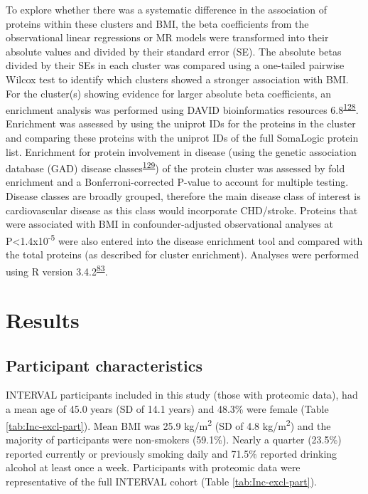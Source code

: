 \documentclass[11pt,twoside]{bristolthesis}
\begin{document}
To explore whether there was a systematic difference in the association of proteins within these clusters and BMI, the beta coefficients from the observational linear regressions or MR models were transformed into their absolute values and divided by their standard error (SE). The absolute betas divided by their SEs in each cluster was compared using a one-tailed pairwise Wilcox test to identify which clusters showed a stronger association with BMI. For the cluster(s) showing evidence for larger absolute beta coefficients, an enrichment analysis was performed using DAVID bioinformatics resources 6.8\textsuperscript{\protect\hyperlink{ref-Huang2009}{128}}. Enrichment was assessed by using the uniprot IDs for the proteins in the cluster and comparing these proteins with the uniprot IDs of the full SomaLogic protein list. Enrichment for protein involvement in disease (using the genetic association database (GAD) disease classes\textsuperscript{\protect\hyperlink{ref-Becker2004a}{129}}) of the protein cluster was assessed by fold enrichment and a Bonferroni-corrected P-value to account for multiple testing. Disease classes are broadly grouped, therefore the main disease class of interest is cardiovascular disease as this class would incorporate CHD/stroke. Proteins that were associated with BMI in confounder-adjusted observational analyses at P\textless1.4x10\textsuperscript{-5} were also entered into the disease enrichment tool and compared with the total proteins (as described for cluster enrichment). Analyses were performed using R version 3.4.2\textsuperscript{\protect\hyperlink{ref-Team2019a}{83}}.

\hypertarget{results-3}{%
\section{Results}\label{results-3}}

\hypertarget{participant-characteristics-1}{%
\subsection{Participant characteristics}\label{participant-characteristics-1}}

INTERVAL participants included in this study (those with proteomic data), had a mean age of 45.0 years (SD of 14.1 years) and 48.3\% were female (Table \ref{tab:Inc-excl-part}). Mean BMI was 25.9 kg/m\textsuperscript{2} (SD of 4.8 kg/m\textsuperscript{2}) and the majority of participants were non-smokers (59.1\%). Nearly a quarter (23.5\%) reported currently or previously smoking daily and 71.5\% reported drinking alcohol at least once a week. Participants with proteomic data were representative of the full INTERVAL cohort (Table \ref{tab:Inc-excl-part}).
\end{document}
